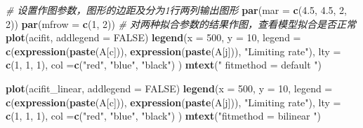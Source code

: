 \documentclass[
]{krantz}
\makeatletter
\newenvironment{Shaded}{\begin{snugshade}}{\end{snugshade}}
\newcommand{\CommentTok}[1]{\textcolor[rgb]{0.56,0.35,0.01}{\textit{#1}}}
\newcommand{\DataTypeTok}[1]{\textcolor[rgb]{0.13,0.29,0.53}{#1}}
\newcommand{\DecValTok}[1]{\textcolor[rgb]{0.00,0.00,0.81}{#1}}
\newcommand{\FloatTok}[1]{\textcolor[rgb]{0.00,0.00,0.81}{#1}}
\newcommand{\KeywordTok}[1]{\textcolor[rgb]{0.13,0.29,0.53}{\textbf{#1}}}
\newcommand{\NormalTok}[1]{#1}
\newcommand{\OtherTok}[1]{\textcolor[rgb]{0.56,0.35,0.01}{#1}}
\newcommand{\StringTok}[1]{\textcolor[rgb]{0.31,0.60,0.02}{#1}}
\newenvironment{kframe}{%
\medskip{}
\setlength{\fboxsep}{.8em}
 \def\at@end@of@kframe{}%
 \ifinner\ifhmode%
  \def\at@end@of@kframe{\end{minipage}}%
  \begin{minipage}{\columnwidth}%
 \fi\fi%
 \def\FrameCommand##1{\hskip\@totalleftmargin \hskip-\fboxsep
 \colorbox{shadecolor}{##1}\hskip-\fboxsep
     \hskip-\linewidth \hskip-\@totalleftmargin \hskip\columnwidth}%
 \MakeFramed {\advance\hsize-\width
   \@totalleftmargin\z@ \linewidth\hsize
   \@setminipage}}%
 {\par\unskip\endMakeFramed%
 \at@end@of@kframe}
\renewenvironment{Shaded}{\begin{kframe}}{\end{kframe}}
\makeatother
\begin{document}
\begin{Shaded}
\begin{Highlighting}[]
\CommentTok{\# 设置作图参数，图形的边距及分为1行两列输出图形}
\KeywordTok{par}\NormalTok{(}\DataTypeTok{mar =} \KeywordTok{c}\NormalTok{(}\FloatTok{4.5}\NormalTok{, }\FloatTok{4.5}\NormalTok{, }\DecValTok{2}\NormalTok{, }\DecValTok{2}\NormalTok{))}
\KeywordTok{par}\NormalTok{(}\DataTypeTok{mfrow =} \KeywordTok{c}\NormalTok{(}\DecValTok{1}\NormalTok{, }\DecValTok{2}\NormalTok{))}
\CommentTok{\# 对两种拟合参数的结果作图，查看模型拟合是否正常}
\KeywordTok{plot}\NormalTok{(acifit, }\DataTypeTok{addlegend =} \OtherTok{FALSE}\NormalTok{)}
\KeywordTok{legend}\NormalTok{(}\DataTypeTok{x =} \DecValTok{500}\NormalTok{, }\DataTypeTok{y =} \DecValTok{10}\NormalTok{, }
       \DataTypeTok{legend =} \KeywordTok{c}\NormalTok{(}\KeywordTok{expression}\NormalTok{(}\KeywordTok{paste}\NormalTok{(A[c])), }
                \KeywordTok{expression}\NormalTok{(}\KeywordTok{paste}\NormalTok{(A[j])),}
                \StringTok{"Limiting rate"}\NormalTok{),}
       \DataTypeTok{lty =} \KeywordTok{c}\NormalTok{(}\DecValTok{1}\NormalTok{, }\DecValTok{1}\NormalTok{, }\DecValTok{1}\NormalTok{),}
       \DataTypeTok{col =}\KeywordTok{c}\NormalTok{(}\StringTok{"red"}\NormalTok{, }\StringTok{"blue"}\NormalTok{, }\StringTok{"black"}\NormalTok{) }
\NormalTok{         )}
\KeywordTok{mtext}\NormalTok{(}\StringTok{" fitmethod = \textquotesingle{}default\textquotesingle{} "}\NormalTok{)}

\KeywordTok{plot}\NormalTok{(acifit\_linear, }\DataTypeTok{addlegend =} \OtherTok{FALSE}\NormalTok{)}
\KeywordTok{legend}\NormalTok{(}\DataTypeTok{x =} \DecValTok{500}\NormalTok{, }\DataTypeTok{y =} \DecValTok{10}\NormalTok{, }
       \DataTypeTok{legend =} \KeywordTok{c}\NormalTok{(}\KeywordTok{expression}\NormalTok{(}\KeywordTok{paste}\NormalTok{(A[c])), }
                  \KeywordTok{expression}\NormalTok{(}\KeywordTok{paste}\NormalTok{(A[j])),}
                  \StringTok{"Limiting rate"}\NormalTok{),}
       \DataTypeTok{lty =} \KeywordTok{c}\NormalTok{(}\DecValTok{1}\NormalTok{, }\DecValTok{1}\NormalTok{, }\DecValTok{1}\NormalTok{),}
       \DataTypeTok{col =}\KeywordTok{c}\NormalTok{(}\StringTok{"red"}\NormalTok{, }\StringTok{"blue"}\NormalTok{, }\StringTok{"black"}\NormalTok{) }
\NormalTok{)}
\KeywordTok{mtext}\NormalTok{(}\StringTok{"fitmethod = \textquotesingle{}bilinear\textquotesingle{} "}\NormalTok{)}
\end{Highlighting}
\end{Shaded}
\end{document}
